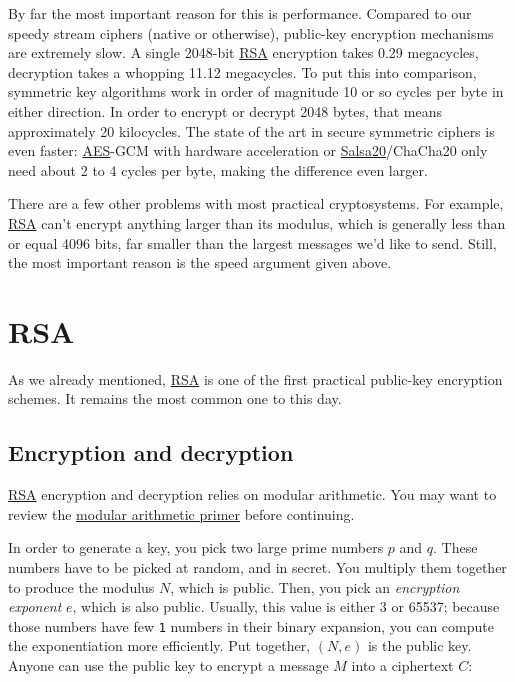 \documentclass[11pt,ebook,table,dvipsnames]{memoir}
\begin{document}
By far the most important reason for this is performance. Compared to
our speedy stream ciphers (native or otherwise), public-key encryption
mechanisms are extremely slow. A single 2048-bit \hyperref[RSA]{RSA} encryption takes
0.29 megacycles, decryption takes a whopping 11.12 megacycles.
\cite{cryptopp:bench} To put this into comparison, symmetric key
algorithms work in order of magnitude 10 or so cycles per byte in
either direction. In order to encrypt or decrypt 2048 bytes, that
means approximately 20 kilocycles. The state of the art in secure
symmetric ciphers is even faster: \hyperref[AES]{AES}-GCM with hardware acceleration
or \hyperref[Salsa20]{Salsa20}/ChaCha20 only need about 2 to 4 cycles per byte, making the
difference even larger.

There are a few other problems with most practical cryptosystems. For
example, \hyperref[RSA]{RSA} can't encrypt anything larger than its modulus, which is
generally less than or equal 4096 bits, far smaller than the largest
messages we'd like to send. Still, the most important reason is the
speed argument given above.
\section{\label{RSA}RSA}
\label{sec-2-5-3}

As we already mentioned, \hyperref[RSA]{RSA} is one of the first practical
\gls{public-key encryption} schemes. It remains the most common one
to this day.

\subsection{Encryption and decryption}
\label{sec-2-5-3-1}

\hyperref[RSA]{RSA} encryption and decryption relies on modular arithmetic. You may
want to review the \hyperref[Modular-arithmetic]{modular arithmetic primer} before continuing.

In order to generate a key, you pick two large prime numbers $p$ and
$q$. These numbers have to be picked at random, and in secret. You
multiply them together to produce the modulus $N$, which is public.
Then, you pick an \emph{encryption exponent} $e$, which is also public.
Usually, this value is either 3 or 65537; because those numbers have
few \verb~1~ numbers in their binary expansion, you can compute the
exponentiation more efficiently. Put together, $(N, e)$ is the public
key. Anyone can use the public key to encrypt a message $M$ into a
ciphertext $C$:
\end{document}
